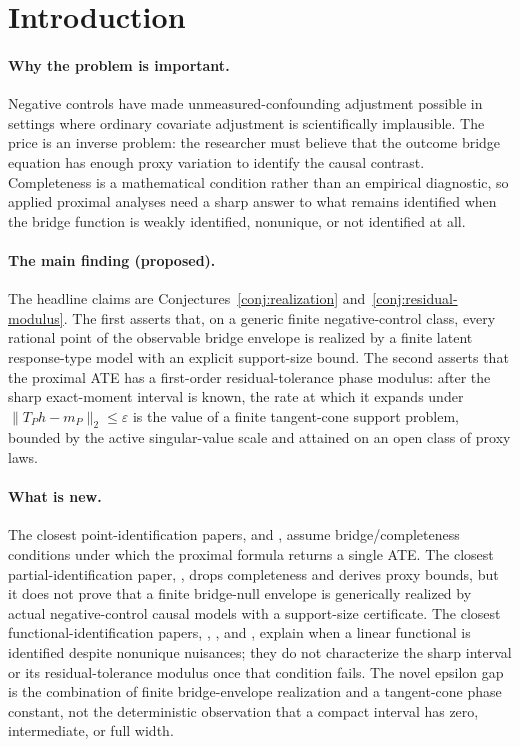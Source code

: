 \documentclass[11pt]{article}
\theoremstyle{definition}
\theoremstyle{plain}
\theoremstyle{remark}
\begin{document}
\section{Introduction}
\paragraph{Why the problem is important.}
Negative controls have made unmeasured-confounding adjustment possible in
settings where ordinary covariate adjustment is scientifically implausible.
The price is an inverse problem: the researcher must believe that the outcome
bridge equation has enough proxy variation to identify the causal contrast.
Completeness is a mathematical condition rather than an empirical diagnostic,
so applied proximal analyses need a sharp answer to what remains identified
when the bridge function is weakly identified, nonunique, or not identified at
all.

\paragraph{The main finding (proposed).}
The headline claims are Conjectures~\ref{conj:realization}
and~\ref{conj:residual-modulus}.  The first asserts that, on a generic
finite negative-control class, every rational point of the observable bridge
envelope is realized by a finite latent response-type model with an explicit
support-size bound.  The second asserts that the proximal ATE has a
first-order residual-tolerance phase modulus: after the sharp exact-moment
interval is known, the rate at which it expands under
\(\|T_Ph-m_P\|_2\le\varepsilon\) is the value of a finite tangent-cone support
problem, bounded by the active singular-value scale and attained on an open
class of proxy laws.

\paragraph{What is new.}
The closest point-identification papers, \citet{MiaoGengTchetgen2018Biometrika}
and \citet{CuiPuShiMiaoTchetgen2024JASA}, assume bridge/completeness
conditions under which the proximal formula returns a single ATE.  The closest
partial-identification paper, \citet{GhassamiShpitserTchetgen2023ProxyPI},
drops completeness and derives proxy bounds, but it does not prove that a
finite bridge-null envelope is generically realized by actual
negative-control causal models with a support-size certificate.  The closest
functional-identification papers,
\citet{ZhangLiMiaoTchetgen2023SPL},
\citet{BennettKallusMaoNeweySyrgkanisUehara2023COLT}, and
\citet{Santos2011JoE}, explain when a linear functional is identified despite
nonunique nuisances; they do not characterize the sharp interval or its
residual-tolerance modulus once that condition fails.  The novel epsilon gap
is the combination of finite bridge-envelope realization and a tangent-cone
phase constant, not the deterministic observation that a compact interval has
zero, intermediate, or full width.
\end{document}

